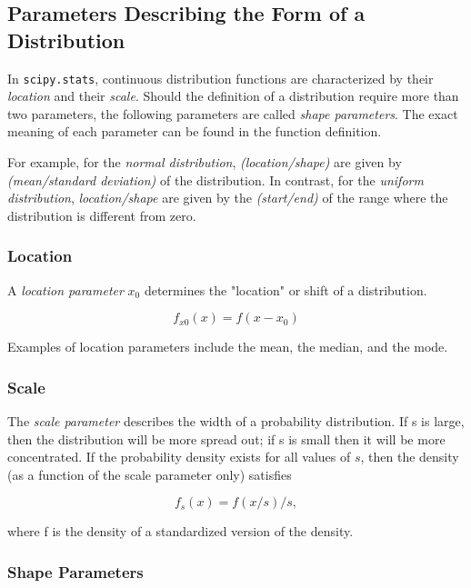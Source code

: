 \subsection{Parameters Describing the Form of a Distribution}

In \lstinline{scipy.stats}, continuous distribution functions are characterized by their \emph{location} and their \emph{scale}. Should the definition of a distribution require more than two parameters, the following parameters are called \emph{shape parameters}.  The exact meaning of each parameter can be found in the function definition.

For example, for the \emph{normal distribution}, \emph{(location/shape)} are given by \emph{(mean/standard deviation)} of the distribution. In contrast, for the \emph{uniform distribution}, \emph{location/shape} are given by the \emph{(start/end)} of the range where the distribution is different from zero.

\subsubsection{Location}

A \emph{location parameter} $x_0$  determines the "location" or shift of a distribution.

\begin{equation*}
  f_{x0}(x)=f(x-x_0)
\end{equation*}

Examples of location parameters include the mean, the median, and the mode.

\subsubsection{Scale}

The \emph{scale parameter} describes the width of a probability distribution.  If s is large, then the distribution will be more spread out; if s is small then it will be more concentrated. If the probability density exists for all values of $s$, then the density (as a function of the scale parameter only) satisfies

\begin{equation*}
   f_s(x) = f(x/s)/s,
\end{equation*}

where f is the density of a standardized version of the density.

\subsubsection{Shape Parameters}

